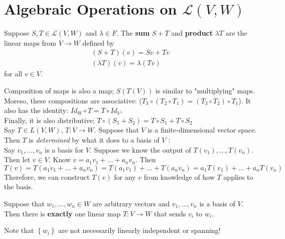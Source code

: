 \documentclass{memoir}
\begin{document}
\section{Algebraic Operations on $\mathcal{L}(V,W)$}	
	
\begin{defn}
Suppose $S,T \in \mathcal{L}(V,W)$ and $\lambda \in F$. The  \textbf{sum} $S+T$ and \textbf{product} $\lambda T$ are the linear maps from $V \to W$ defined by
\begin{align*}
	(S+T)(v) = Sv + Tv \\
	(\lambda T)(v) = \lambda(Tv)
\end{align*}
for all $v \in V$.
\end{defn}
Composition of maps is also a map; $S(T(V))$ is similar to "multiplying" maps.\\ 

Moreso, these compositions are associative: ($T_3 \circ (T_2\circ T_1) = (T_3\circ T_2) \circ T_1$). It also has the identity: $Id_W \circ T = T \circ Id_V$.\\

Finally, it is also distributive; $T \circ (S_1+S_2) = T\circ S_1 + T \circ S_2$\\

Say $T \in L(V,W)$, $T:V\to W$. Suppose that $V$ is a finite-dimensional vector space. Then $T$ is \textit{determined} by what it does to a basis of $V$ :\\

Say $v_1,\ldots,v_n$ is a basis for $V$. Suppose we know the output of $T(v_1),\ldots,T(v_n)$. Then let $v \in V$. Know $v = a_1v_1+\ldots+a_nv_n$. Then $T(v) = T(a_1v_1+\ldots+a_nv_n) = T(a_1v_1)+\ldots+T(a_nv_n) = a_1T(v_1) + \ldots + a_n T(v_n)$\\

Therefore, we can construct $T(v)$ for any $v$ from knowledge of how $T$ applies to the basis.
\color{black}
\begin{thm}
	Suppose that $w_1,\ldots,w_n \in W$ are arbitrary vectors and $v_1,\ldots,v_n$ is a basis of $V$. Then there is \textbf{exactly} one linear map $T:V\to W$ that sends $v_i$ to $w_i$.
\end{thm}
Note that \(\left\{ w_i \right\} \) are not necessarily linearly independent or spanning!
\end{document}
